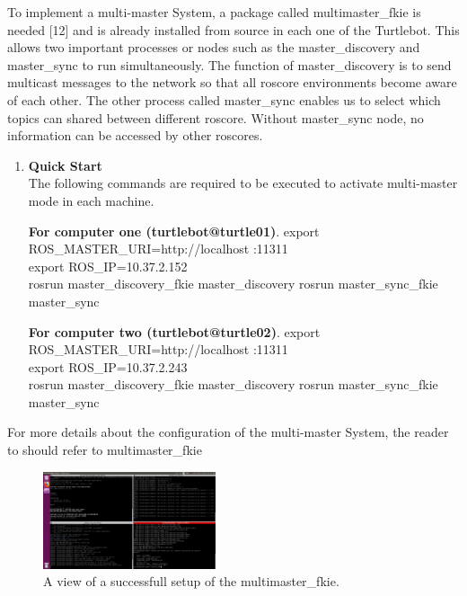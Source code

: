 \documentclass[journal]{IEEEtran}
\begin{document}
\begin{enumerate}
\begin{enumerate}
To implement a multi-master System, a package called
multimaster{\_}fkie is needed [12] and is already installed from source in each one of the Turtlebot. This allows two important processes or nodes such as the master{\_}discovery and master{\_}sync to run
simultaneously. The function of master{\_}discovery is to
send multicast messages to the network so that all roscore
environments become aware of each other. The other process called master{\_}sync enables us to select which topics can shared between different roscore. Without master{\_}sync node, no information can be accessed by other roscores. 

\begin{enumerate}
\item \textbf {Quick Start}\\
The following commands are required to be executed to activate multi-master mode in each machine.

\textbf{For computer one (turtlebot@turtle01)}.
export ROS{\_}MASTER{\_}URI=http://localhost :11311\\
export ROS{\_}IP=10.37.2.152\\
rosrun master{\_}discovery{\_}fkie master{\_}discovery
rosrun master{\_}sync{\_}fkie master{\_}sync



\textbf{For computer two (turtlebot@turtle02)}.
export ROS{\_}MASTER{\_}URI=http://localhost :11311\\
export ROS{\_}IP=10.37.2.243\\
rosrun master{\_}discovery{\_}fkie master{\_}discovery
rosrun master{\_}sync{\_}fkie master{\_}sync
\end{enumerate}
For more details about the configuration of the multi-master System, the reader to should refer to multimaster{\_}fkie\cite{temp11}

\begin{figure}[!h]
\begin{center}
\includegraphics[width=2in]{5.png}
\caption{A view of a successfull setup of the multimaster{\_}fkie.}
\end{center}
\label{fig:mypicture4}
\end{figure}


\end{enumerate}











\end{enumerate}
\end{document}
